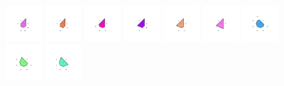 \documentclass[text.tex]{subfiles}
\begin{document}
\begin{figure}[h!]
\includegraphics[width=0.12\textwidth]{img/results/octagon/octagon_222487_(-8_7alpha_4)_005.pdf}
\includegraphics[width=0.12\textwidth]{img/results/octagon/octagon_222487_(-8_7alpha_4)_006.pdf}
\includegraphics[width=0.12\textwidth]{img/results/octagon/octagon_222487_(-8_7alpha_4)_007.pdf}
\includegraphics[width=0.12\textwidth]{img/results/octagon/octagon_222487_(-8_7alpha_4)_008.pdf}
\includegraphics[width=0.12\textwidth]{img/results/octagon/octagon_222487_(-8_7alpha_4)_009.pdf}
\includegraphics[width=0.12\textwidth]{img/results/octagon/octagon_222487_(-8_7alpha_4)_010.pdf}
\includegraphics[width=0.12\textwidth]{img/results/octagon/octagon_222487_(-8_7alpha_4)_011.pdf}
\includegraphics[width=0.12\textwidth]{img/results/octagon/octagon_222487_(-8_7alpha_4)_012.pdf}
\includegraphics[width=0.12\textwidth]{img/results/octagon/octagon_222487_(-8_7alpha_4)_013.pdf}

\end{figure}
\end{document}

